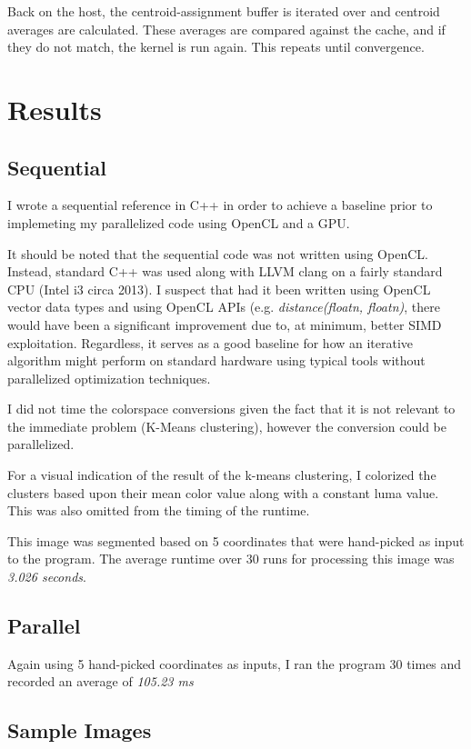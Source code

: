 \documentclass[11pt]{article}
\begin{document}
Back on the host, the centroid-assignment buffer is iterated over and centroid
averages are calculated. These averages are compared against the cache, and if they
do not match, the kernel is run again. This repeats until convergence.

\section{Results}

\subsection{Sequential}

I wrote a sequential reference in C++ in order to achieve a baseline prior to implemeting
my parallelized code using OpenCL and a GPU.

It should be noted that the sequential code was not written using OpenCL. Instead, standard C++
was used along with LLVM clang on a fairly standard CPU (Intel i3 circa 2013). I suspect that
had it been written using OpenCL vector data types and using OpenCL APIs (e.g.
\textit{distance(floatn, floatn)}, there would  have been a significant improvement due to,
at minimum, better SIMD exploitation. Regardless, it serves as a good baseline for how an
iterative algorithm might perform on standard hardware using typical tools without parallelized
optimization techniques.

I did not time the colorspace conversions given the fact that it is not relevant to the
immediate problem (K-Means clustering), however the conversion could be parallelized.

For a visual indication of the result of the k-means clustering, I colorized the clusters
based upon their mean color value along with a constant luma value. This was also omitted
from the timing of the runtime.

This image was segmented based on 5 coordinates that were hand-picked as input to the program.
The average runtime over 30 runs for processing this image was \emph{3.026 seconds}.

\subsection{Parallel}

Again using 5 hand-picked coordinates as inputs, I ran the program 30 times and recorded an
average of \emph{105.23 ms}

\subsection{Sample Images}
\end{document}
